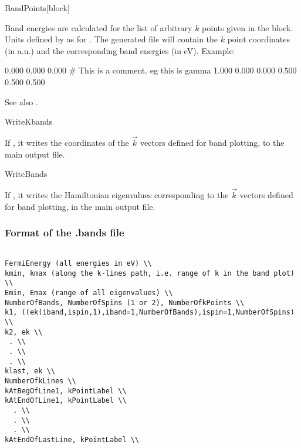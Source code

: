 \begin{fdfentry}{BandPoints}[block]
  
  Band energies are calculated for the list of arbitrary $k$ points
  given in the block. Units defined by  as for
  . The generated  file will contain the
  $k$ point coordinates (in a.u.) and the corresponding band energies
  (in eV). Example:
  \begin{fdfexample}
        0.000  0.000  0.000   # This is a comment. eg this is gamma
        1.000  0.000  0.000
        0.500  0.500  0.500
  \end{fdfexample}

  See also .
\end{fdfentry}


\begin{fdflogicalF}{WriteKbands}

  If \fdftrue, it writes the coordinates of the $\vec k$ vectors
  defined for band plotting, to the main output file.

\end{fdflogicalF}

\begin{fdflogicalF}{WriteBands}

  If \fdftrue, it writes the Hamiltonian eigenvalues corresponding to
  the $\vec k$ vectors defined for band plotting, in the main output
  file. 

\end{fdflogicalF}


\subsubsection{Format of the .bands file}

\begin{verbatim}

FermiEnergy (all energies in eV) \\
kmin, kmax (along the k-lines path, i.e. range of k in the band plot) \\
Emin, Emax (range of all eigenvalues) \\
NumberOfBands, NumberOfSpins (1 or 2), NumberOfkPoints \\
k1, ((ek(iband,ispin,1),iband=1,NumberOfBands),ispin=1,NumberOfSpins) \\
k2, ek \\
 . \\
 . \\
 . \\
klast, ek \\
NumberOfkLines \\
kAtBegOfLine1, kPointLabel \\
kAtEndOfLine1, kPointLabel \\
  . \\
  . \\
  . \\
kAtEndOfLastLine, kPointLabel \\
\end{verbatim}

